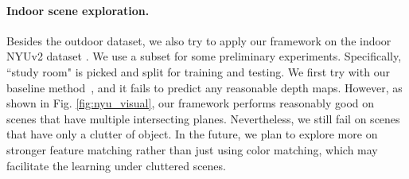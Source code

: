 \vspace{-0.8\baselineskip}
\paragraph{Indoor scene exploration.}
Besides the outdoor dataset, we also try to apply our framework on the indoor NYUv2 dataset \cite{silberman2012indoor}. We use a subset for some preliminary experiments. Specifically, ``study room" is picked and split for training and testing. We first try with our baseline method~\cite{zhou2017unsupervised}, and it fails to predict any reasonable depth maps. However, as shown in Fig. \ref{fig:nyu_visual}, our framework performs reasonably good on scenes that have multiple intersecting planes. Nevertheless, we still fail on scenes that have only a clutter of object. In the future, we plan to explore more on stronger feature matching rather than just using color matching, which may facilitate the learning under cluttered scenes.

